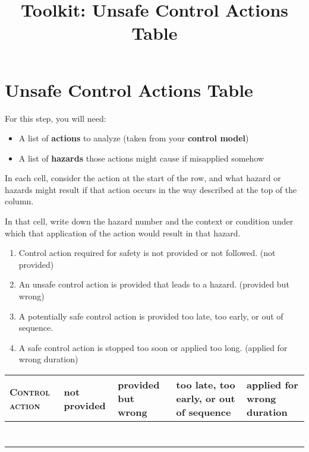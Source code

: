 \documentclass[a4paper]{tufte-book}
\title{Toolkit: Unsafe Control Actions Table}
\begin{document}
\setlength{\parindent}{0em}
\setlength{\parskip}{.75em}



\section{Unsafe Control Actions Table}

\begin{fullwidth}

For this step, you will need:
\begin{itemize}
\item A list of \textbf{actions} to analyze (taken from your \textbf{control model})
\item A list of \textbf{hazards} those actions might cause if misapplied somehow
\end{itemize}

In each cell, consider the action at the start of the row, and what hazard or hazards might result if that action occurs in the way described at the top of the column. 

In that cell, write down the hazard number and the context or condition under which that application of the action would result in that hazard.

\begin{enumerate}
\item Control action \hbox{required} for safety is not provided or not followed. (not provided)
\item An unsafe control action is provided that leads to a hazard.  (provided but wrong)
\item A potentially safe control action is provided too late, too early, or out of sequence.
\item A safe control action is stopped too soon or applied too long. (applied for wrong duration)
\end{enumerate}

\begin{table}
\renewcommand{\arraystretch}{3}
\begin{tabular}{|p{3cm}|p{3cm}|p{3cm}|p{3cm}|p{3cm}|}
\hline
\textsc{Control action}&\textbf{not provided}&\textbf{provided but wrong}&\textbf{too late, too early, or out of sequence}&\textbf{applied for wrong duration}\\
\hline
&&&&\\
\hline
&&&&\\
\hline
&&&&\\
\hline
&&&&\\
\hline
&&&&\\
\hline
&&&&\\
\hline
&&&&\\
\hline
\end{tabular}
\vspace{1em}
\end{table}

\end{fullwidth}
\end{document}
